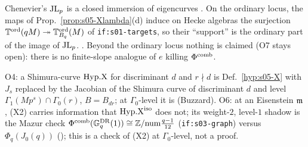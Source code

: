 \begin{remark}\label{rem:s05-O7}
Chenevier's $\mathrm{JL}_p$ is a closed immersion of eigencurves
. On the ordinary locus, the maps
of Prop.~\ref{prop:s05-Xlambda}(d) induce on Hecke algebras the surjection $\mathbb{T}^{\mathrm{ord}}(qM)\twoheadrightarrow\mathbb{T}^{\mathrm{ord}}_{B_q}(M)$ of
\texttt{if:s01-targets}, so their ``support'' is the ordinary part of the image of $\mathrm{JL}_p$. \stsketch. Beyond the ordinary locus
nothing is claimed (O7 stays open): there is no finite-slope analogue of $e$ killing $\Phi^{\mathrm{comb}}$.
\end{remark}

\begin{remark}\label{rem:s05-O46}
O4: a Shimura-curve $\mathrm{Hyp.X}$ for discriminant $d$ and $r\nmid d$ is Def.~\ref{hyp:s05-X} with $J_s$ replaced by the Jacobian of
the Shimura curve of discriminant $d$ and level $\Gamma_1(Mp^s)\cap\Gamma_0(r)$, $B=B_{dr}$; at $\Gamma_0$-level it is
 (Buzzard). O6: at an Eisenstein $\mathfrak{m}$, (X2)
carries information that $\mathrm{Hyp.X}^{\mathrm{iso}}$ does not; its weight-$2$, level-$1$ shadow is the Mazur check
$\Phi^{\mathrm{comb}}(\mathbb{G}^{\mathrm{DR}}_q(1))\cong\mathbb{Z}/\mathrm{num}\frac{q-1}{12}$ (\texttt{if:s03-graph}) versus $\Phi_q(J_0(q))$
(); this is a check of (X2) at
$\Gamma_0$-level, not a proof.
\end{remark}

